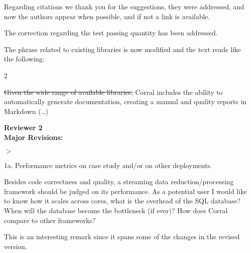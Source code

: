 \documentclass[a4paper,onecolumn,fleqn,usenatbib,useAMS]{mnrasr}
\newenvironment{frshaded}{%
\def\FrameCommand{\fboxrule=\FrameRule\fboxsep=\FrameSep \fcolorbox{framecolor}{shadecolor}}%
\MakeFramed {\FrameRestore}}%
{\endMakeFramed}
\newenvironment{myindentpar}[1]%
 {\begin{list}{}%
         \bigskip
         \color{refereecolor}
         {\setlength{\leftmargin}{#1}}%
         \itshape
         \item[$>$]%
 }
 {\end{list}}
\begin{document}
Regarding citations we thank you for the suggestions, they were addressed,
and now the authors appear when possible, and if not a link is available.

The correction regarding the test passing quantity has been addressed.

The phrase related to existing libraries is now modified and the text
reads like the following:

\begin{frshaded}
\begin{multicols}{2} 
   
%
\st{Given the wide range of available libraries,}
\mdseries
Corral includes the ability to automatically
generate documentation, creating a manual and quality reports in
Markdown (\ldots)

\end{multicols} 
\end{frshaded} 



\vspace{1cm}
\bfseries
Reviewer 2 \\
Major Revisions:

\mdseries
\begin{myindentpar}{1cm}
1a. Performance metrics on case study and/or on other deployments.

Besides code correctness and quality, a streaming data
reduction/processing framework should be judged on its performance. As
a potential user I would like to know how it scales across cores, what
is the overhead of the SQL database?  When will the database become
the bottleneck (if ever)? How does Corral compare to other frameworks?
 
\end{myindentpar}

%
This is an interesting remark since it spans some of the changes in the 
revised version.
\end{document}
